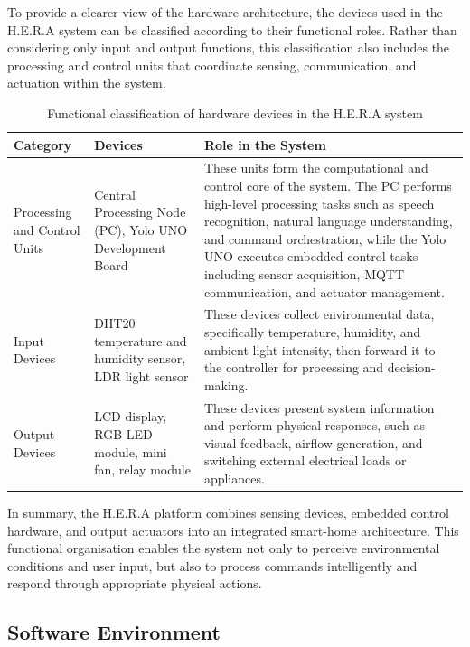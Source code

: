 To provide a clearer view of the hardware architecture, the devices used in the H.E.R.A system can be classified according to their functional roles. Rather than considering only input and output functions, this classification also includes the processing and control units that coordinate sensing, communication, and actuation within the system.

\begin{table}[H]
  \centering
  \caption{Functional classification of hardware devices in the H.E.R.A system}
  \label{tab:functional_classification}
  \renewcommand{\arraystretch}{1.2}
  \small
  \begin{tabularx}{\textwidth}{|p{2.2cm}|p{4.0cm}|X|}
    \hline
    \textbf{Category} & \textbf{Devices} & \textbf{Role in the System} \\
    \hline \hline
    Processing and Control Units
    & Central Processing Node (PC), Yolo UNO Development Board
    & These units form the computational and control core of the system. The PC performs high-level processing tasks such as speech recognition, natural language understanding, and command orchestration, while the Yolo UNO executes embedded control tasks including sensor acquisition, MQTT communication, and actuator management. \\
    \hline
    Input Devices
    & DHT20 temperature and humidity sensor, LDR light sensor
    & These devices collect environmental data, specifically temperature, humidity, and ambient light intensity, then forward it to the controller for processing and decision-making. \\
    \hline
    Output Devices
    & LCD display, RGB LED module, mini fan, relay module
    & These devices present system information and perform physical responses, such as visual feedback, airflow generation, and switching external electrical loads or appliances. \\
    \hline
  \end{tabularx}
\end{table}

In summary, the H.E.R.A platform combines sensing devices, embedded control hardware, and output actuators into an integrated smart-home architecture. This functional organisation enables the system not only to perceive environmental conditions and user input, but also to process commands intelligently and respond through appropriate physical actions.





\subsection{Software Environment}

